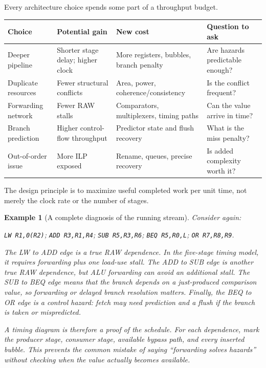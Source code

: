\documentclass[11pt]{article}
\newtheorem{example}{Example}[section]
\begin{document}
Every architecture choice spends some part of a throughput budget.
\begin{center}
\begin{tabular}{@{}>{\raggedright\arraybackslash}p{2.8cm}>{\raggedright\arraybackslash}p{3.2cm}>{\raggedright\arraybackslash}p{3.2cm}>{\raggedright\arraybackslash}p{3.0cm}@{}}
\toprule
\textbf{Choice} & \textbf{Potential gain} & \textbf{New cost} &
\textbf{Question to ask} \\
\midrule
Deeper pipeline & Shorter stage delay; higher clock & More registers, bubbles, branch penalty & Are hazards predictable enough? \\
Duplicate resources & Fewer structural conflicts & Area, power, coherence/consistency & Is the conflict frequent? \\
Forwarding network & Fewer RAW stalls & Comparators, multiplexers, timing paths & Can the value arrive in time? \\
Branch prediction & Higher control-flow throughput & Predictor state and flush recovery & What is the miss penalty? \\
Out-of-order issue & More ILP exposed & Rename, queues, precise recovery & Is added complexity worth it? \\
\bottomrule
\end{tabular}
\end{center}

The design principle is to maximize useful completed work per unit time, not
merely the clock rate or the number of stages.

\begin{example}[A complete diagnosis of the running stream]
\label{ex:running-stream}
Consider again:
\begin{center}
\texttt{LW R1,0(R2)}; \texttt{ADD R3,R1,R4}; \texttt{SUB R5,R3,R6};
\texttt{BEQ R5,R0,L}; \texttt{OR R7,R8,R9}.
\end{center}
The LW to ADD edge is a true RAW dependence. In the five-stage timing model,
it requires forwarding plus one load-use stall. The ADD to SUB edge is another
true RAW dependence, but ALU forwarding can avoid an additional stall. The SUB
to BEQ edge means that the branch depends on a just-produced comparison value,
so forwarding or delayed branch resolution matters. Finally, the BEQ to OR
edge is a control hazard: fetch may need prediction and a flush if the branch
is taken or mispredicted.

A timing diagram is therefore a proof of the schedule. For each dependence,
mark the producer stage, consumer stage, available bypass path, and every
inserted bubble. This prevents the common mistake of saying ``forwarding
solves hazards'' without checking when the value actually becomes available.
\end{example}
\end{document}
